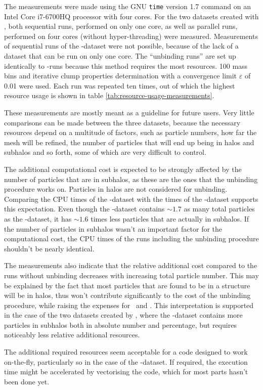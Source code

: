 The measurements were made using the GNU \verb|time| version 1.7 command on an Intel Core i7-6700HQ processor with four cores.
For the two datasets created with \dice, both sequential runs, performed on only one core, as well as parallel runs, performed on four cores (without hyper-threading) were measured.
Measurements of sequential runs of the \cosmo-dataset were not possible, because of the lack of a dataset that can be run on only one core.
The ``unbinding runs'' are set up identically to \iter-runs because this method requires the most resources.
100 mass bins and iterative clump properties determination with a convergence limit $\varepsilon$ of 0.01 were used.
Each run was repeated ten times, out of which the highest resource usage is shown in table \ref{tab:resource-usage-measurements}.

These measurements are mostly meant as a guideline for future users.
Very little comparisons can be made between the three datasets, because the necessary resources depend on a multitude of factors, such as particle numbers, how far the mesh will be refined, the number of particles that will end up being in halos and subhalos and so forth, some of which are very difficult to control.

The additional computational cost is expected to be strongly affected by the number of particles that are in subhalos, as these are the ones that the unbinding procedure works on. 
Particles in halos are not considered for unbinding.
Comparing the CPU times of the \ds-dataset with the times of the \cosmo-dataset supports this expectation.
Even though the \cosmo-dataset contains $\sim 1.7$ as many total particles as the \ds-dataset, it has $\sim 1.6$ times less particles that are actually in subhalos.
If the number of particles in subhalos wasn't an important factor for the computational cost, the CPU times of the runs including the unbinding procedure shouldn't be nearly identical.

The measurements also indicate that the relative additional cost compared to the runs without unbinding decreases with increasing total particle number.
This may be explained by the fact that most particles that are found to be in a structure will be in halos, thus won't contribute significantly to the cost of the unbinding procedure, while raising the expenses for \ramses\ and \phew.
This interpretation is supported in the case of the two datasets created by \dice, where the \ds-dataset contains more particles in subhalos both in absolute number and percentage, but requires noticeably less relative additional resources.

The additional required resources seem acceptable for a code designed to work on-the-fly, particularly so in the case of the \cosmo-dataset. 
If required, the execution time might be accelerated by vectorising the code, which for most parts hasn't been done yet.




